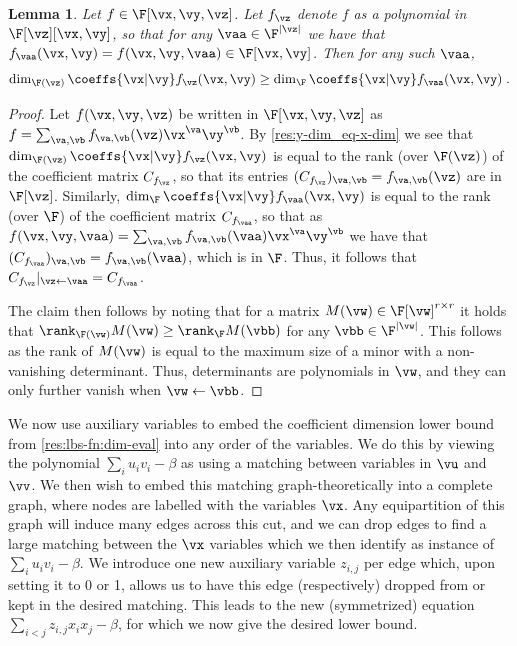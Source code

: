 \documentclass[11pt]{article}
\numberwithin{equation}{section}
\newtheorem{lemma}[theorem]{Lemma}
\theoremstyle{definition}
\theoremstyle{plain}
\begin{document}
\begin{lemma}\label{res:coeff-dim:fraction-field}
        Let $f\in\F[\vx,\vy,\vz]$. Let $f_\vz$ denote $f$ as a polynomial in $\F[\vz][\vx,\vy]$, so that for any $\vaa\in\F^{|\vz|}$ we have that $f_\vaa(\vx,\vy)=f(\vx,\vy,\vaa) \in\F[\vx,\vy]$.  Then for any such $\vaa$,
        \[
                \dim_{\F(\vz)}\coeffs{\vx|\vy} f_\vz(\vx,\vy) \ge \dim_\F \coeffs{\vx|\vy}f_\vaa(\vx,\vy)
                \;.
        \]
\end{lemma}
\begin{proof}
        Let $f(\vx,\vy,\vz)$ be written in $\F[\vx,\vy,\vz]$ as $f=\sum_{\va,\vb} f_{\va,\vb} (\vz)\vx^\va\vy^\vb$. By \autoref{res:y-dim_eq-x-dim} we see that $\dim_{\F(\vz)}\coeffs{\vx|\vy} f_\vz(\vx,\vy)$ is equal to the rank (over $\F(\vz)$) of the coefficient matrix $C_{f_\vz}$, so that its entries $(C_{f_\vz})_{\va,\vb}=f_{\va,\vb}(\vz)$ are in $\F[\vz]$.  Similarly, $\dim_{\F}\coeffs{\vx|\vy} f_\vaa(\vx,\vy)$ is equal to the rank (over $\F$) of the coefficient matrix $C_{f_\vaa}$, so that as $f(\vx,\vy,\vaa)= \sum_{\va,\vb} f_{\va,\vb}(\vaa)\vx^\va\vy^\vb$ we have that $(C_{f_\vaa})_{\va,\vb}=f_{\va,\vb}(\vaa)$, which is in $\F$.  Thus, it follows that $C_{f_\vz}|_{\vz\leftarrow\vaa}=C_{f_\vaa}$.

        The claim then follows by noting that for a matrix $M(\vw)\in\F[\vw]^{r\times r}$ it holds that $\rank_{\F(\vw)} M(\vw)\ge \rank_{\F} M(\vbb)$ for any $\vbb\in\F^{|\vw|}$. This follows as the rank of $M(\vw)$ is equal to the maximum size of a minor with a non-vanishing determinant.  Thus,  determinants are polynomials in $\vw$, and they can only further vanish when $\vw\leftarrow\vbb$. %
%
%
\end{proof}

We now use auxiliary variables to embed the coefficient dimension lower bound from \autoref{res:lbs-fn:dim-eval} into any order of the variables.  We do this by viewing the polynomial $\sum_i u_iv_i-\beta$ as using a matching between variables in $\vu$ and $\vv$.  We then wish to embed this matching graph-theoretically into a complete graph, where nodes are labelled with the variables $\vx$.  Any equipartition of this graph will induce many edges across this cut, and we can drop edges to find a large matching between the $\vx$ variables which we then identify as instance of $\sum_i u_iv_i-\beta$.  We introduce one new auxiliary variable $z_{i,j}$ per edge which, upon setting it to 0 or 1, allows us to have this edge (respectively) dropped from or kept in the desired matching.  This leads to the new (symmetrized) equation $\sum_{i<j} z_{i,j} x_ix_j-\beta$, for which we now give the desired lower bound.
\end{document}
